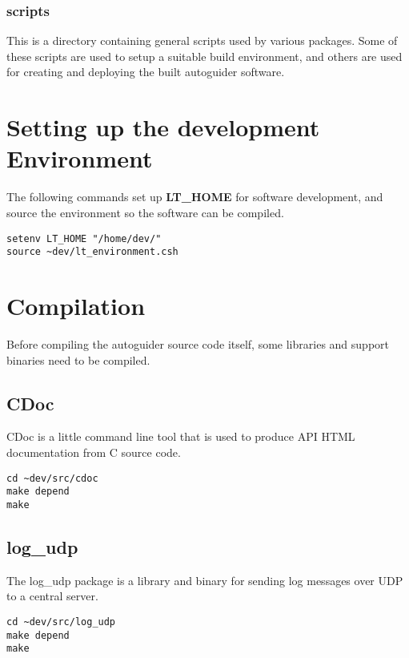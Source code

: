 \documentclass[10pt,a4paper]{article}
\begin{document}
\subsubsection{scripts}

This is a directory containing general scripts used by various packages. Some of these scripts are used to setup a suitable build environment, and others are used for creating and deploying the built autoguider software.

\section{Setting up the development Environment}
\label{sec:devenvironment}

The following commands set up {\bf LT\_HOME} for software development, and source the environment so the software can be compiled.

\begin{verbatim}
setenv LT_HOME "/home/dev/"
source ~dev/lt_environment.csh
\end{verbatim}

\section{Compilation}

Before compiling the autoguider source code itself, some libraries and support binaries need to be compiled.

\subsection{CDoc}

CDoc is a little command line tool that is used to produce API HTML documentation from C source code.

\begin{verbatim}
cd ~dev/src/cdoc
make depend
make
\end{verbatim}

\subsection{log\_udp}

The log\_udp package is a library and binary for sending log messages over UDP to a central server.

\begin{verbatim}
cd ~dev/src/log_udp
make depend
make
\end{verbatim}
\end{document}
